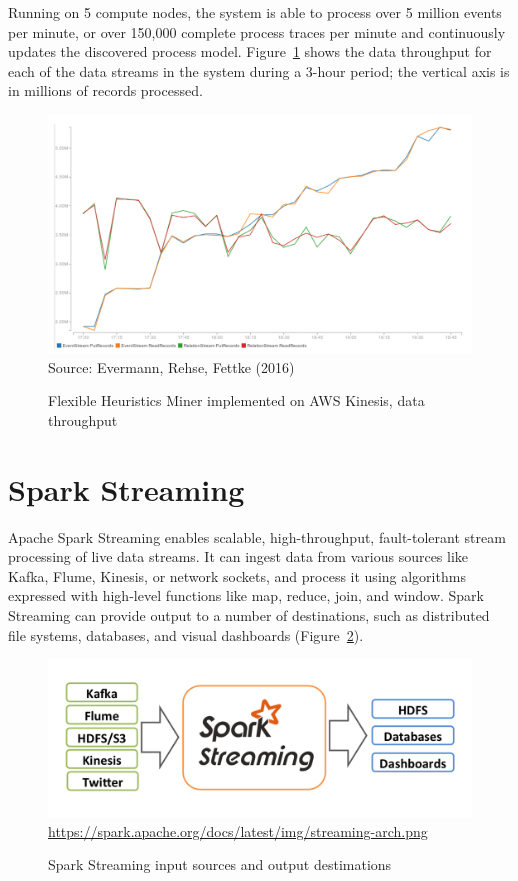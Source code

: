 Running on 5 compute nodes, the system is able to process over 5 million events per minute, or over 150,000 complete process traces per minute and continuously updates the discovered process model. Figure~\ref{fig:fhmkinesisperformance} shows the data throughput for each of the data streams in the system during a 3-hour period; the vertical axis is in millions of records processed.

\begin{figure}
\centering

\includegraphics[width=.75\textwidth]{screen4.png} \\

\scriptsize Source: Evermann, Rehse, Fettke (2016) \normalsize
\caption[FHM on AWS Kinesis -- data throughput]{Flexible Heuristics Miner implemented on AWS Kinesis, data throughput}
\label{fig:fhmkinesisperformance}
\end{figure}

\FloatBarrier
\section{Spark Streaming}

Apache Spark Streaming enables scalable, high-throughput, fault-tolerant stream processing of live data streams. It can ingest data from various sources like Kafka, Flume, Kinesis, or network sockets, and process it using algorithms expressed with high-level functions like map, reduce, join, and window. Spark Streaming can provide output to a number of destinations, such as distributed file systems, databases, and visual dashboards (Figure~\ref{fig:sparkstreaming1}).

\begin{figure}
\centering

\includegraphics[width=.75\textwidth]{streaming-arch.png} \\
\scriptsize\url{https://spark.apache.org/docs/latest/img/streaming-arch.png}\normalsize \\

\caption{Spark Streaming input sources and output destimations}
\label{fig:sparkstreaming1}
\end{figure}


